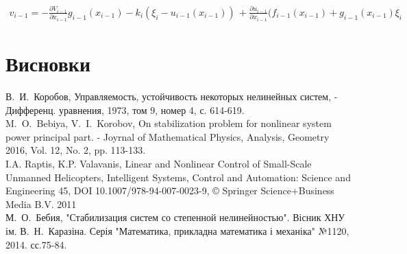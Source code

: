 \documentclass{article}
\begin{document}
\begin{eqnarray}
    v_{i-1}=-{\frac  {\partial V_{{i-1}}}{\partial x_{{i-1}}}}g_{{i-1}}(x_{{i-1}})-k_{i}\left(\xi_{i}-u_{{i-1}}(x_{{i-1}})\right)\,
    +{\frac  {\partial u_{{i-1}}}{\partial x_{{i-1}}}}(f_{{i-1}}(x_{{i-1}})+g_{{i-1}}(x_{{i-1}})\xi_{i}
\end{eqnarray}







\pagebreak
\section{Висновки}


\pagebreak
\begin{thebibliography}{}
    В.~И.~Коробов, Управляемость, устойчивость некоторых нелинейных систем, 
    -  Дифференц. уравнения, 1973, том 9, номер 4, с. 614-619.\\
    M.~O.~Bebiya, V.~I.~Korobov, On stabilization problem for nonlinear system power principal part. 
    - Joyrnal of Mathematical Physics, Analysis, Geometry 2016, Vol. 12, No. 2, pp. 113-133.\\
    I.A. Raptis, K.P. Valavanis, Linear and Nonlinear Control of Small-Scale Unmanned Helicopters, 
    Intelligent Systems, Control and Automation: Science and Engineering 45, 
    DOI 10.1007/978-94-007-0023-9, © Springer Science+Business Media B.V. 2011\\
    М.~О.~Бебия, "Стабилизация систем со степенной нелинейностью". Вісник ХНУ ім. В.~Н.~Каразіна. 
    Серія "Математика, прикладна математика і механіка" №1120, 2014. сс.75-84.\\
\end{thebibliography}
\end{document}
